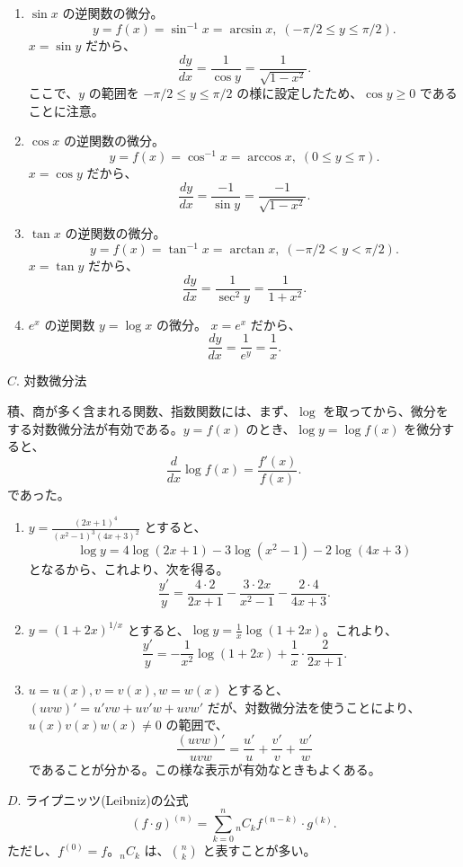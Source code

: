 \begin{eg}
\begin{enumerate}
\item $\sin x$ の逆関数の微分。
$$y = f(x) = \sin^{-1} x = \arcsin x, \; (-\pi/2 \leq y \leq \pi/2).$$
$x = \sin y$ だから、
$$\frac{dy}{dx} = \frac{1}{\cos y} = \frac{1}{\sqrt{1-x^2}}.$$
ここで、$y$ の範囲を $-\pi/2 \leq y \leq \pi/2$ の様に設定したため、$\cos y\geq 0$ であることに注意。
\item $\cos x$ の逆関数の微分。
$$y = f(x) = \cos^{-1} x = \arccos x, \; (0 \leq y \leq \pi).$$
$x = \cos y$ だから、
$$\frac{dy}{dx} = \frac{-1}{\sin y} = \frac{-1}{\sqrt{1-x^2}}.$$
\item $\tan x$ の逆関数の微分。
$$y = f(x) = \tan^{-1} x = \arctan x, \; (-\pi/2 < y < \pi/2).$$
$x = \tan y$ だから、
$$\frac{dy}{dx} = \frac{1}{\sec^2 y} = \frac{1}{1+x^2}.$$
\item $e^x$ の逆関数 $y = \log x$ の微分。
$x = e^x$ だから、
$$\frac{dy}{dx} = \frac{1}{e^y} = \frac{1}{x}.$$
\end{enumerate}
\end{eg}

\medskip
$C$. 対数微分法

積、商が多く含まれる関数、指数関数には、まず、$\log$ を取ってから、微分をする対数微分法が有効である。$y = f(x)$ のとき、$\log y = \log f(x)$ を微分すると、
$$\frac{d}{dx}\log f(x) = \frac{f'(x)}{f(x)}.$$
であった。

\begin{eg}
\begin{enumerate}
\item ${\displaystyle y = \frac{(2x+1)^4}{(x^2-1)^3(4x+3)^2}}$ とすると、
$$\log y = 4\log(2x+1) - 3\log(x^2-1) - 2\log(4x+3)$$
となるから、これより、次を得る。
$$\frac{y'}{y} = \frac{4\cdot2}{2x+1} - \frac{3\cdot2x}{x^2 -1} - \frac{2\cdot4}{4x+3}.$$
\item $y = (1+2x)^{1/x}$ とすると、$\log y = \frac{1}{x}\log(1+2x)$。これより、
$$\frac{y'}{y} = -\frac{1}{x^2}\log(1+2x) + \frac1x\cdot\frac{2}{2x+1}.$$
\item $u = u(x), v = v(x), w = w(x)$ とすると、$(uvw)' = u'vw + uv'w + uvw'$ だが、対数微分法を使うことにより、$u(x)v(x)w(x) \neq 0$ の範囲で、
$$\frac{(uvw)'}{uvw} = \frac{u'}{u} + \frac{v'}{v} + \frac{w'}{w}$$
であることが分かる。この様な表示が有効なときもよくある。
\end{enumerate}
\end{eg}

\medskip
$D$. ライプニッツ(Leibniz)の公式
$$(f\cdot g)^{(n)} = \sum_{k=0}^n {}_nC_k f^{(n-k)}\cdot g^{(k)}.$$
ただし、$f^{(0)} = f$。${}_nC_k$ は、${n \choose k}$ と表すことが多い。

